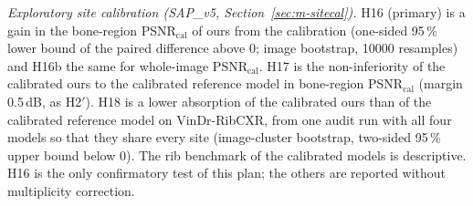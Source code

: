 \emph{Exploratory site calibration (SAP\_v5, Section~\ref{sec:m-sitecal}).} H16 (primary) is a gain in the bone-region
PSNR$_{\mathrm{cal}}$ of ours from the calibration (one-sided 95\,\% lower bound of the paired difference above 0; image bootstrap,
\num{10000} resamples) and H16b the same for whole-image PSNR$_{\mathrm{cal}}$. H17 is the non-inferiority of the calibrated ours to the
calibrated reference model in bone-region PSNR$_{\mathrm{cal}}$ (margin 0.5\,dB, as H2$'$). H18 is a lower absorption of the calibrated ours
than of the calibrated reference model on VinDr-RibCXR, from one audit run with all four models so that they share every site
(image-cluster bootstrap, two-sided 95\,\% upper bound below 0). The rib benchmark of the calibrated models is descriptive. H16 is the only
confirmatory test of this plan; the others are reported without multiplicity correction.

